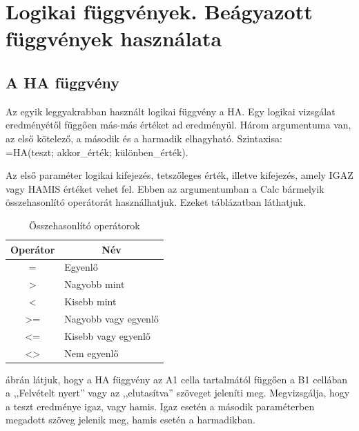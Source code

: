 \chapter{Logikai függvények. Beágyazott függvények használata}
\thispagestyle{empty}


\section{A HA függvény}

Az egyik leggyakrabban használt logikai függvény a HA. Egy
logikai vizsgálat eredményétől függően más-más
értéket ad eredményül. Három argumentuma van, az első
kötelező, a második és a harmadik elhagyható. Szintaxisa:\\ 
=HA(teszt; akkor\_érték; különben\_érték).

Az első paraméter logikai kifejezés,  tetszőleges
érték, illetve kifejezés, amely IGAZ vagy HAMIS értéket vehet
fel. Ebben az argumentumban a Calc bármelyik összehasonlító
operátorát használhatjuk. Ezeket  táblázatban
láthatjuk.

\begin{table}[!h]
\begin{center}
\caption{Összehasonlító operátorok}\label{ÖsszehasonlítóOp}
\begin{tabular}{|c|l|}
\hline
\textbf{Operátor}&
\multicolumn{1}{c|}{\textbf{Név}} \\
\hline
=&
Egyenlő\\ \hline
\textgreater &
Nagyobb mint\\ \hline
\textless &
Kisebb mint\\ \hline
\textgreater= &
Nagyobb vagy egyenlő\\ \hline
\textless= &
Kisebb vagy egyenlő\\ \hline
\textless\textgreater &
Nem egyenlő\\ \hline
\end{tabular}
\end{center}
\end{table}

 ábrán látjuk, hogy a HA függvény az A1 cella
tartalmától függően a B1 cellában a
,,Felvételt nyert'' vagy az
,,elutasítva'' szöveget jeleníti
meg. Megvizsgálja, hogy a teszt eredménye igaz, vagy hamis. Igaz
esetén a második paraméterben megadott szöveg jelenik meg,
hamis esetén a harmadikban.

